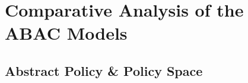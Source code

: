 \section{Comparative Analysis of the ABAC Models}
	
	
	\subsection{Abstract Policy \& Policy Space}
	
 
						
 